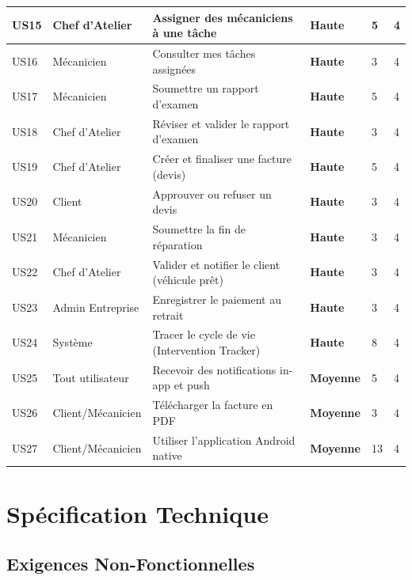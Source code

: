 \documentclass[12pt,a4paper]{report}
\begin{document}
\begin{longtable}{|p{0.7cm}|p{4cm}|p{5.5cm}|p{1.3cm}|p{0.7cm}|p{1.2cm}|}
\hline
US15 & Chef d'Atelier & Assigner des mécaniciens à une tâche & \textcolor{prioH}{\bfseries Haute} & 5 & 4 \\
\hline
US16 & Mécanicien & Consulter mes tâches assignées & \textcolor{prioH}{\bfseries Haute} & 3 & 4 \\
\hline
US17 & Mécanicien & Soumettre un rapport d'examen & \textcolor{prioH}{\bfseries Haute} & 5 & 4 \\
\hline
US18 & Chef d'Atelier & Réviser et valider le rapport d'examen & \textcolor{prioH}{\bfseries Haute} & 3 & 4 \\
\hline
US19 & Chef d'Atelier & Créer et finaliser une facture (devis) & \textcolor{prioH}{\bfseries Haute} & 5 & 4 \\
\hline
US20 & Client & Approuver ou refuser un devis & \textcolor{prioH}{\bfseries Haute} & 3 & 4 \\
\hline
US21 & Mécanicien & Soumettre la fin de réparation & \textcolor{prioH}{\bfseries Haute} & 3 & 4 \\
\hline
US22 & Chef d'Atelier & Valider et notifier le client (véhicule prêt) & \textcolor{prioH}{\bfseries Haute} & 3 & 4 \\
\hline
US23 & Admin Entreprise & Enregistrer le paiement au retrait & \textcolor{prioH}{\bfseries Haute} & 3 & 4 \\
\hline
US24 & Système & Tracer le cycle de vie (Intervention Tracker) & \textcolor{prioH}{\bfseries Haute} & 8 & 4 \\
\hline
US25 & Tout utilisateur & Recevoir des notifications in-app et push & \textcolor{prioM}{\bfseries Moyenne} & 5 & 4 \\
\hline
US26 & Client/Mécanicien & Télécharger la facture en PDF & \textcolor{prioM}{\bfseries Moyenne} & 3 & 4 \\
\hline
US27 & Client/Mécanicien & Utiliser l'application Android native & \textcolor{prioM}{\bfseries Moyenne} & 13 & 4 \\
\hline
\end{longtable}

\section{Spécification Technique}

\subsection{Exigences Non-Fonctionnelles}
\end{document}
